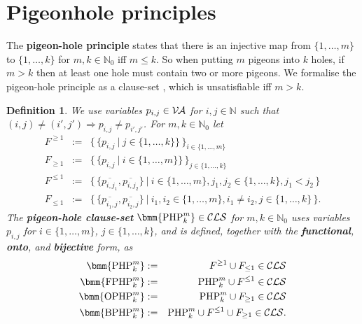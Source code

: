 \documentclass{report}
\newtheorem{defi}{Definition}[section]
\newcommand{\mb}{{\:|\:}} %
\newcommand{\set}[1]{\{ #1 \}}
\newcommand{\setb}[1]{\big \{ \, #1 \, \big \}}
\newcommand{\tb}[2]{\set{#1, \dots, #2}} %
\newcommand{\ol}{\overline}
\newcommand{\Ra}{\Rightarrow}
\newcommand{\mc}{\mathcal}
\newcommand{\NN}{\mathbb{N}}
\newcommand{\NNZ}{\NN_0}
\newcommand{\Va}{\mc{V\hspace{-0.1em}A}}
\newcommand{\Cls}{\mc{CLS}}
\newcommand{\php}{\mathrm{PHP}}
\newcommand{\fphp}{\mathrm{FPHP}} %
\newcommand{\ophp}{\mathrm{OPHP}} %
\newcommand{\ofphp}{\mathrm{BPHP}} %
\begin{document}
\section{Pigeonhole principles}
\label{sec:php}

The \textbf{pigeon-hole principle} states that there is an injective map from $\tb1m$ to $\tb1k$ for $m,k \in \NNZ$ iff $m \le k$. So when putting $m$ pigeons into $k$ holes, if $m > k$ then at least one hole must contain two or more pigeons. We formalise the pigeon-hole principle as a clause-set \bmm{\php^m_k}, which is unsatisfiable iff $m > k$.
\begin{defi}\label{def:php}
  We use variables $p_{i,j} \in \Va$ for $i, j \in \NN$ such that $(i,j) \not= (i',j') \Ra p_{i,j} \not= p_{i',j'}$. For $m, k \in \NNZ$ let
  \begin{eqnarray*}
    F^{\ge 1} & := & \setb{\set{p_{i,j} \mb j \in \tb1k}}_{i \in \tb1m }\\
     F_{\ge 1} & := & \setb{\set{p_{i,j} \mb i \in \tb 1m}}_{j \in \tb 1k }\\
    F^{\le 1} & := & \setb{\set{\ol{p_{i,j_1}},\ol{p_{i,j_2}}} \mb i \in \tb 1m, j_1, j_2 \in \tb 1k, j_1 < j_2}\\
    F_{\le 1} & := & \setb{ \set{\ol{p_{i_1,j}},\ol{p_{i_2,j}}} \mb i_1,i_2 \in \tb1m, i_1 \not= i_2, j \in \tb1k }.
  \end{eqnarray*}
  The \textbf{pigeon-hole clause-set} $\bmm{\php^m_k} \in \Cls$ for $m,k \in \NNZ$ uses variables $p_{i,j}$ for $i \in \tb 1m$, $j \in \tb 1k$, and is defined, together with the \textbf{functional}, \textbf{onto}, and \textbf{bijective} form, as
  \begin{eqnarray*}
    \bmm{\php^m_k} & := & F^{\ge 1} \cup F_{\le 1} \in \Cls\\
    \bmm{\fphp^m_k} & := & \php^m_k \cup F^{\le 1} \in \Cls\\
    \bmm{\ophp^m_k} & := & \php^m_k \cup F_{\ge 1} \in \Cls\\
    \bmm{\ofphp^m_k} & := & \php^m_k \cup F^{\le 1} \cup F_{\ge 1} \in \Cls.
  \end{eqnarray*}
\end{defi}
\end{document}
